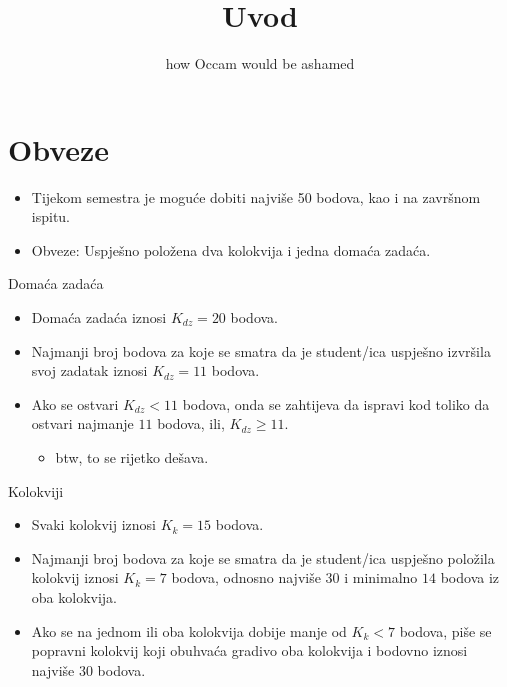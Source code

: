 \documentclass[9pt]{beamer}
\title{Uvod}
\subtitle{how Occam would be ashamed}
\institute{Računalna grafika}
\begin{document}
\begin{frame}
 \titlepage
\end{frame}

\section{Obveze}
\begin{frame}
	\begin{itemize}
		\item Tijekom semestra je moguće dobiti najviše 50 bodova, kao i na završnom ispitu.
		\item Obveze: Uspješno položena dva kolokvija i jedna domaća zadaća.
	\end{itemize}
\end{frame}
\begin{frame}{Domaća zadaća}
	\begin{itemize}
		\item Domaća zadaća iznosi $K_{dz} = 20$ bodova. 
		\item Najmanji broj bodova za koje se smatra da je student/ica uspješno izvršila svoj zadatak iznosi $K_{dz} = 11$ bodova. 
		\item Ako se ostvari $K_{dz}<11$ bodova, onda se zahtijeva da ispravi kod toliko da ostvari najmanje $11$ bodova, ili, $K_{dz}\ge 11 $. 
		\begin{itemize}
			\item btw, to se rijetko dešava.
		\end{itemize}
	\end{itemize}
\end{frame}
\begin{frame}{Kolokviji}
	\begin{itemize}
		\item Svaki kolokvij iznosi $K_k = 15$ bodova. 
		\item Najmanji broj bodova za koje se smatra da je student/ica uspješno položila kolokvij iznosi $K_k = 7$ bodova, odnosno najviše $30$ i minimalno $14$ bodova iz oba kolokvija.
		\item Ako se na jednom ili oba kolokvija dobije manje od $K_k < 7$ bodova, piše se popravni kolokvij koji obuhvaća gradivo oba kolokvija i bodovno iznosi najviše $30$ bodova.
	\end{itemize}
\end{frame}
\end{document}
